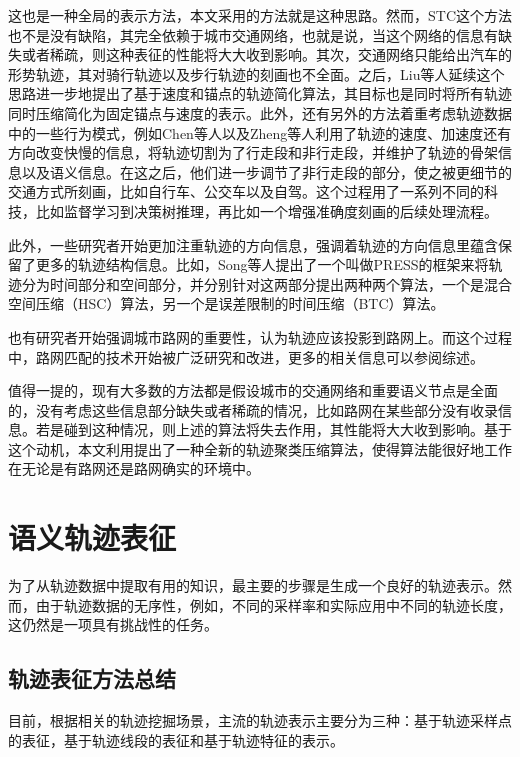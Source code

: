这也是一种全局的表示方法，本文采用的方法就是这种思路。然而，STC这个方法也不是没有缺陷，其完全依赖于城市交通网络，也就是说，当这个网络的信息有缺失或者稀疏，则这种表征的性能将大大收到影响。其次，交通网络只能给出汽车的形势轨迹，其对骑行轨迹以及步行轨迹的刻画也不全面。之后，Liu等人\cite{liu2014compressing}延续这个思路进一步地提出了基于速度和锚点的轨迹简化算法，其目标也是同时将所有轨迹同时压缩简化为固定锚点与速度的表示。此外，还有另外的方法着重考虑轨迹数据中的一些行为模式，例如Chen等人\cite{chen2009trajectory}以及Zheng等人\cite{zheng2010understanding}利用了轨迹的速度、加速度还有方向改变快慢的信息，将轨迹切割为了行走段和非行走段，并维护了轨迹的骨架信息以及语义信息。在这之后，他们进一步调节了非行走段的部分，使之被更细节的交通方式所刻画，比如自行车、公交车以及自驾。这个过程用了一系列不同的科技，比如监督学习到决策树推理，再比如一个增强准确度刻画的后续处理流程。

此外，一些研究者开始更加注重轨迹的方向信息，强调着轨迹的方向信息里蕴含保留了更多的轨迹结构信息。比如，Song等人\cite{song2014press}提出了一个叫做PRESS的框架来将轨迹分为时间部分和空间部分，并分别针对这两部分提出两种两个算法，一个是混合空间压缩（HSC）算法，另一个是误差限制的时间压缩（BTC）算法。

也有研究者开始强调城市路网的重要性，认为轨迹应该投影到路网上。而这个过程中，路网匹配的技术开始被广泛研究和改进\cite{civilis2005techniques,gotsman2015dilution,popa2015spatio,dong2018novel}，更多的相关信息可以参阅综述\cite{Renso:2013:MDM:2553228,zheng2015trajectory,mazimpaka2016trajectory}。

值得一提的，现有大多数的方法都是假设城市的交通网络和重要语义节点是全面的，没有考虑这些信息部分缺失或者稀疏的情况，比如路网在某些部分没有收录信息。若是碰到这种情况，则上述的算法将失去作用，其性能将大大收到影响。基于这个动机，本文利用提出了一种全新的轨迹聚类压缩算法，使得算法能很好地工作在无论是有路网还是路网确实的环境中。

\section{语义轨迹表征}

为了从轨迹数据中提取有用的知识，最主要的步骤是生成一个良好的轨迹表示。然而，由于轨迹数据的无序性，例如，不同的采样率和实际应用中不同的轨迹长度，这仍然是一项具有挑战性的任务。

\subsection{轨迹表征方法总结}
目前，根据相关的轨迹挖掘场景，主流的轨迹表示主要分为三种：基于轨迹采样点的表征\cite{yuan2013t,zheng2011learning,anagnostopoulos2017tour}，基于轨迹线段的表征\cite{bellman1961approximation,lee2007trajectory,lee2011trajectory}和基于轨迹特征的表示\cite{annoni2012analysis,ardakani2017encoding,pelekis2017temporal}。

